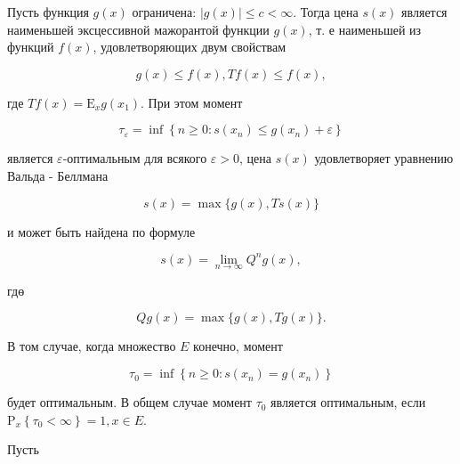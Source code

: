 \documentclass[10pt]{article}
\begin{document}
Пусть функция $g(x)$ ограничена: $|g(x)| \leqslant c<\infty$. Тогда цена $s(x)$ является наименьшей эксцессивной мажорантой функции $g(x)$, т. е наименьшей из функций $f(x)$, удовлетворяющих двум свойствам



\[

g(x) \leqslant f(x), T f(x) \leqslant f(x),

\]



где $T f(x)=\mathrm{E}_{x} g\left(x_{1}\right)$. При этом момент



\[

\tau_{\varepsilon}=\inf \left\{n \geqslant 0: s\left(x_{n}\right) \leqslant g\left(x_{n}\right)+\varepsilon\right\}

\]



является $\varepsilon$-оптимальным для всякого $\varepsilon>0$, цена $s(x)$ удовлетворяет уравнению Вальда - Беллмана



\[

s(x)=\max \{g(x), T s(x)\}

\]



и может быть найдена по формуле



\[

s(x)=\lim _{n \rightarrow \infty} Q^{n} g(x),

\]



гдө



\[

Q g(x)=\max \{g(x), T g(x)\} .

\]



В том случае, когда множество $E$ конечно, момент



\[

\tau_{0}=\inf \left\{n \geqslant 0: s\left(x_{n}\right)=g\left(x_{n}\right)\right\}

\]



будет оптимальным. В общем случае момент $\tau_{0}$ является оптимальным, если $\mathrm{P}_{x}\left\{\tau_{0}<\infty\right\}=1, x \in E$.



Пусть
\end{document}

